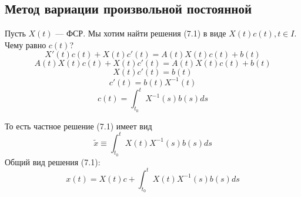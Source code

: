 \subsection*{Метод вариации произвольной постоянной}
Пусть \(X(t)\) --- ФСР. Мы хотим найти решения (7.1) в виде \(X(t)c(t), t \in I\). Чему равно \(c(t)\)?
\[X'(t)c(t) + X(t)c'(t) = A(t)X(t)c(t) + b(t)\]
\[A(t)X(t)c(t) + X(t)c'(t) = A(t)X(t)c(t) + b(t)\]
\[X(t)c'(t) = b(t)\]
\[c'(t) = b(t)X^{-1}(t)\]
\[c(t) = \int_{t_0}^{t}X^{-1}(s)b(s)ds\]

То есть частное решение (7.1) имеет вид 
\[\tilde{x} \equiv \int_{t_0}^t X(t)X^{-1}(s)b(s)ds\]
Общий вид решения (7.1):
\[x(t) = X(t)c + \int_{t_0}^tX(t)X^{-1}(s)b(s)ds\]
